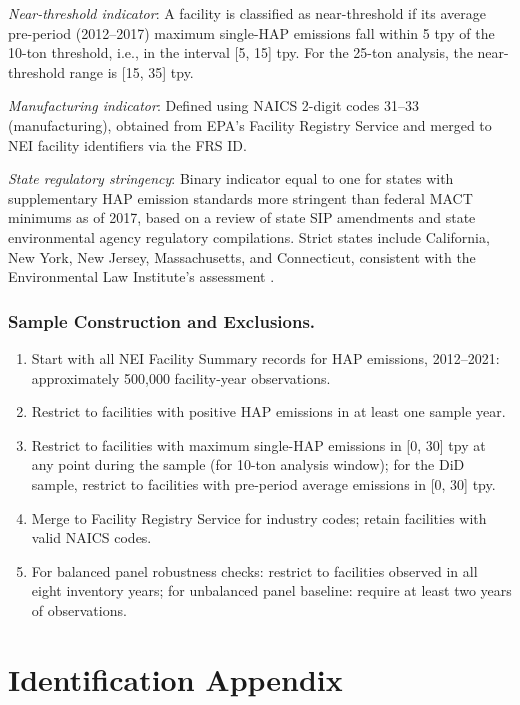 \documentclass[12pt]{article}
\begin{document}
\textit{Near-threshold indicator}: A facility is classified as near-threshold if its average pre-period (2012--2017) maximum single-HAP emissions fall within 5 tpy of the 10-ton threshold, i.e., in the interval [5, 15] tpy. For the 25-ton analysis, the near-threshold range is [15, 35] tpy.

\textit{Manufacturing indicator}: Defined using NAICS 2-digit codes 31--33 (manufacturing), obtained from EPA's Facility Registry Service and merged to NEI facility identifiers via the FRS ID.

\textit{State regulatory stringency}: Binary indicator equal to one for states with supplementary HAP emission standards more stringent than federal MACT minimums as of 2017, based on a review of state SIP amendments and state environmental agency regulatory compilations. Strict states include California, New York, New Jersey, Massachusetts, and Connecticut, consistent with the Environmental Law Institute's assessment \citep{ELI2019}.

\subsubsection*{Sample Construction and Exclusions.}
\begin{enumerate}
\item Start with all NEI Facility Summary records for HAP emissions, 2012--2021: approximately 500,000 facility-year observations.
\item Restrict to facilities with positive HAP emissions in at least one sample year.
\item Restrict to facilities with maximum single-HAP emissions in [0, 30] tpy at any point during the sample (for 10-ton analysis window); for the DiD sample, restrict to facilities with pre-period average emissions in [0, 30] tpy.
\item Merge to Facility Registry Service for industry codes; retain facilities with valid NAICS codes.
\item For balanced panel robustness checks: restrict to facilities observed in all eight inventory years; for unbalanced panel baseline: require at least two years of observations.
\end{enumerate}

\section{Identification Appendix}
\label{sec:id_appendix}
\end{document}
